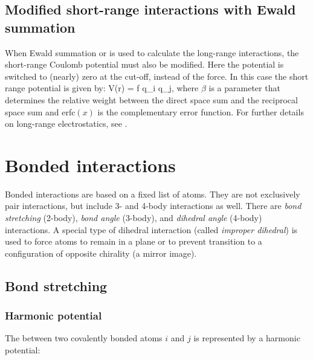 \subsection{Modified short-range interactions with Ewald summation}
When Ewald summation or  is used to calculate the
long-range interactions, the 
short-range Coulomb potential must also be modified. Here the potential
is switched to (nearly) zero at the cut-off, instead of the force.
In this case the short range potential is given by:
\beq
V(r) = f  q_i q_j,
\eeq
where $\beta$ is a parameter that determines the relative weight 
between the direct space sum and the reciprocal space sum and erfc$(x)$ is
the complementary error function. For further 
details on long-range electrostatics, see .


\section{Bonded interactions}
Bonded interactions are based on a fixed list of atoms. They are not
exclusively pair interactions, but include 3- and 4-body interactions
as well. There are {\em bond stretching} (2-body), {\em bond angle}
(3-body), and {\em dihedral angle} (4-body) interactions. A special
type of dihedral interaction (called {\em improper dihedral}) is used
to force atoms to remain in a plane or to prevent transition to a
configuration of opposite chirality (a mirror image).

\subsection{Bond stretching}
\label{sec:bondpot}
\subsubsection{Harmonic potential}
\label{subsec:harmonicbond}
The  between two covalently bonded atoms
$i$ and $j$ is represented by a harmonic potential:

